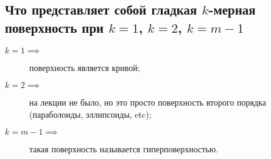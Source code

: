 
\subsection{Что представляет собой гладкая $k$-мерная поверхность при $k = 1$, $k = 2$, $k = m - 1$}

\begin{description}
    \item[$k = 1 \implies$] поверхность является кривой;
    \item[$k = 2 \implies$] на лекции не было, но это просто поверхность второго порядка (параболоиды, эллипсоиды, etc);
    \item[$k = m - 1 \implies $] такая поверхность называется гиперповерхностью.
\end{description}


